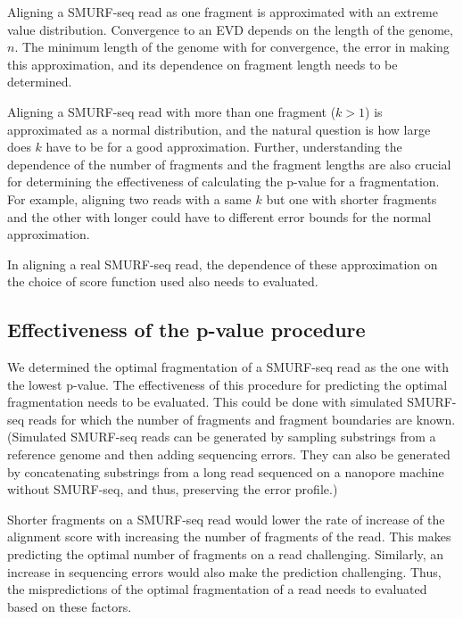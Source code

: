 Aligning a SMURF-seq read as one fragment is approximated with an
extreme value distribution. Convergence to an EVD depends on the length
of the genome, $n$. The minimum length of the genome with for
convergence, the error in making this approximation, and its dependence
on fragment length needs to be determined.

Aligning a SMURF-seq read with more than one fragment ($k > 1$) is
approximated as a normal distribution, and the natural question is how
large does $k$ have to be for a good approximation. Further,
understanding the dependence of the number of fragments and the fragment
lengths are also crucial for determining the effectiveness of
calculating the p-value for a fragmentation. For example, aligning two
reads with a same $k$ but one with shorter fragments and the other with
longer could have to different error bounds for the normal
approximation.

In aligning a real SMURF-seq read, the dependence of these approximation
on the choice of score function used also needs to evaluated.


\subsection*{Effectiveness of the p-value procedure}
We determined the optimal fragmentation of a SMURF-seq read as the one
with the lowest p-value. The effectiveness of this procedure for
predicting the optimal fragmentation needs to be evaluated. This could
be done with simulated SMURF-seq reads for which the number of fragments
and fragment boundaries are known. (Simulated SMURF-seq reads can be
generated by sampling substrings from a reference genome and then adding
sequencing errors. They can also be generated by concatenating
substrings from a long read sequenced on a nanopore machine without
SMURF-seq, and thus, preserving the error profile.)

Shorter fragments on a SMURF-seq read would lower the rate of increase
of the alignment score with increasing the number of fragments of the
read. This makes predicting the optimal number of fragments on a read
challenging.
Similarly, an increase in sequencing errors would also make the
prediction challenging.
%
Thus, the mispredictions of the optimal fragmentation of a read needs to
evaluated based on these factors.

